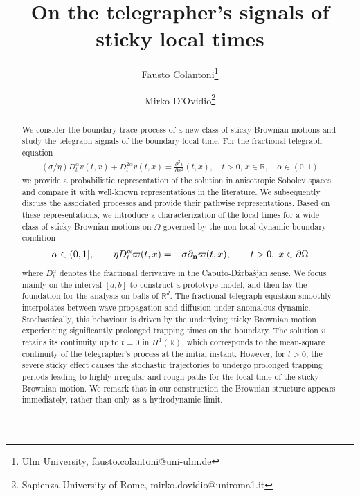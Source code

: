 \documentclass[10pt,a4paper]{article}
\author{Fausto Colantoni\footnote{Ulm University, fausto.colantoni@uni-ulm.de} \and Mirko D'Ovidio\footnote{Sapienza University of Rome, mirko.dovidio@uniroma1.it}}
\numberwithin{equation}{section}
\theoremstyle{plain}
\theoremstyle{remark}
\begin{document}
\title{On the telegrapher's signals of sticky local times}



\maketitle


\begin{abstract}
We consider the boundary trace process of a new class of sticky Brownian motions and  study the telegraph signals of the boundary local time. For the fractional telegraph equation
\begin{align*}
(\sigma/\eta) D^\alpha_t v(t,x)  + D^{2\alpha}_t v(t,x) = \frac{\partial^2 v}{\partial x^2}(t,x), \quad t>0,\, x \in \mathbb{R}, \quad \alpha \in (0,1)
\end{align*}
we provide a probabilistic representation of the solution in anisotropic Sobolev spaces and compare it with well-known representations in the literature. We subsequently discuss the associated processes and provide their pathwise representations. Based on these representations, we introduce a characterization of the local times for a wide class of sticky Brownian motions on $\Omega$ governed by the non-local dynamic boundary condition
\begin{align*}
\alpha \in (0,1], \qquad \eta D^\alpha_t \varpi(t,x) = - \sigma \partial_{\bf n} \varpi(t,x), \qquad t>0, \; x \in \partial \Omega
\end{align*}
where $D^\alpha_t$ denotes the fractional derivative in the Caputo-D\v{z}rba\v{s}jan sense. We focus mainly on the interval $[a,b]$ to construct a prototype model, and then lay the foundation for the analysis on balls of $\mathbb{R}^d$. The fractional telegraph equation smoothly interpolates between wave propagation and diffusion under anomalous dynamic. Stochastically, this behaviour is driven by the underlying sticky Brownian motion experiencing significantly prolonged trapping times on the boundary. The solution $v$ retains its continuity up to $t=0$ in $H^1(\mathbb{R})$, which corresponds to the mean-square continuity of the telegrapher's process at the initial instant. However, for $t>0$, the severe sticky effect causes the stochastic trajectories to undergo prolonged trapping periods leading to highly irregular and rough paths for the local time of the sticky Brownian motion. We remark that in our construction the Brownian structure appears immediately, rather than only as a hydrodynamic limit.
\end{abstract}
\end{document}
